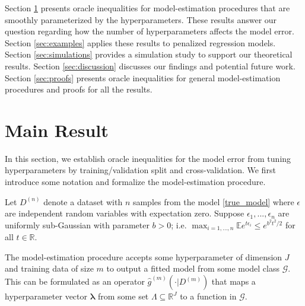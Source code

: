 \documentclass[12pt]{article}
\begin{document}
Section \ref{sec:main_results} presents oracle inequalities for model-estimation procedures that are smoothly parameterized by the hyperparameters. These results answer our question regarding how the number of hyperparameters affects the model error.
Section \ref{sec:examples} applies these results to penalized regression models.
Section \ref{sec:simulations} provides a simulation study to support our theoretical results.
Section \ref{sec:discussion} discusses our findings and potential future work.
Section \ref{sec:proofs} presents oracle inequalities for general model-estimation procedures and proofs for all the results.


\section{Main Result} \label{sec:main_results}

In this section, we establish oracle inequalities for the model error from tuning hyperparameters by  training/validation split and cross-validation.
We first introduce some notation and formalize the model-estimation procedure. 

Let $D^{(n)}$ denote a dataset with $n$ samples from the model \eqref{true_model} where $\epsilon$ are independent random variables with expectation zero. Suppose $\epsilon_1,...,\epsilon_n$ are uniformly sub-Gaussian with parameter $b>0$; i.e. $\max_{i=1,...,n} \mathbb{E} e^{t \epsilon_i} \le e^{b^2t^2/2}$ for all $t \in \mathbb{R}$.

The model-estimation procedure accepts some hyperparameter of dimension $J$ and training data of size $m$ to output a fitted model from some model class $\mathcal{G}$. This can be formulated as an operator $\hat{g}^{(m)}(\cdot | D^{(m)})$ that maps a hyperparameter vector $\boldsymbol{\lambda}$ from some set $\Lambda \subseteq \mathbb{R}^J$ to a function in $\mathcal{G}$. 
\end{document}
